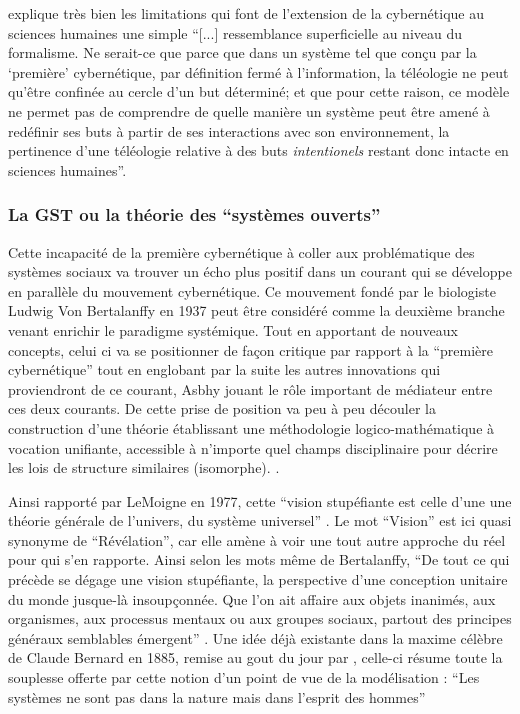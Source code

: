 \autocite[782]{Pouvreau2013} explique très bien les limitations qui font  de l'extension de la cybernétique au sciences humaines une simple \enquote{[...] ressemblance superficielle au niveau du formalisme. Ne serait-ce que parce que dans un système tel que conçu par la \enquote{première} cybernétique, par définition fermé à l'information, la téléologie ne peut qu'être confinée au cercle d'un but déterminé; et que pour cette raison, ce modèle ne permet pas de comprendre de quelle manière un système peut être amené à redéfinir ses buts à partir de ses interactions avec son environnement, la pertinence d'une téléologie relative à des buts \textit{intentionels} restant donc intacte en sciences humaines}.

\subsubsection{La GST ou la théorie des \enquote{systèmes ouverts}}
\label{ssubsec:gst}

Cette incapacité de la première cybernétique à coller aux problématique des systèmes sociaux va trouver un écho plus positif dans un courant qui se développe en parallèle du mouvement cybernétique. Ce mouvement fondé par le biologiste Ludwig Von Bertalanffy en 1937 peut être considéré comme la deuxième branche venant enrichir le paradigme systémique. Tout en apportant de nouveaux concepts, celui ci va se positionner de façon critique par rapport à la \enquote{première cybernétique} tout en englobant par la suite les autres innovations qui proviendront de ce courant, Asbhy jouant le rôle important de médiateur entre ces deux courants.\autocite[]{Pouvreau2013} De cette prise de position va peu à peu découler la construction d'une théorie établissant une méthodologie logico-mathématique à vocation unifiante, accessible à n'importe quel champs disciplinaire pour décrire les lois de structure similaires (isomorphe). \autocite{LeMoigne2006a}. 

Ainsi rapporté par LeMoigne en 1977, cette \enquote{vision stupéfiante est celle d'une une théorie générale de l'univers, du système universel} \autocite[59]{Lemoigne1977}. Le mot \enquote{Vision} est ici quasi synonyme de \enquote{Révélation}, car elle amène à voir une tout autre approche du réel pour qui s'en rapporte. Ainsi selon les mots même de Bertalanffy, \enquote{De tout ce qui précède se dégage une vision stupéfiante, la perspective d'une conception unitaire du monde jusque-là insoupçonnée. Que l'on ait affaire aux objets inanimés, aux organismes, aux processus mentaux ou aux groupes sociaux, partout des principes généraux semblables émergent} \autocite[59]{Lemoigne1977} \autocite[220]{Bertalanffy1949}. Une idée déjà existante dans la maxime célèbre de Claude Bernard en 1885, remise au gout du jour par \autocite{Lemoigne1977}, celle-ci résume toute la souplesse offerte par cette notion d'un point de vue de la modélisation :  \enquote{Les systèmes ne sont pas dans la nature mais dans l'esprit des hommes}

